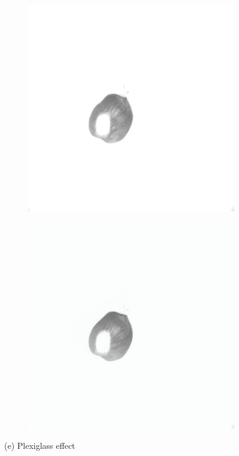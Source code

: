 \documentclass[12pt,DIV14,BCOR12mm,a4paper,footinclude=false,headinclude,parskip=half-,twoside,openright,cleardoublepage=empty,toc=index,bibliography=totoc,listof=totoc]{scrreprt}
\numberwithin{equation}{chapter}
\begin{document}
\begin{figure}
    \vspace{0.3cm} %

    \begin{subfigure}[t]{0.45\textwidth}
        \centering
        \includegraphics[width=\textwidth]{../media/diff_nuts_plexi_real.png}
    \end{subfigure}%
    \hspace{0.02\textwidth}%
    \begin{subfigure}[t]{0.45\textwidth}
        \centering
        \includegraphics[width=\textwidth]{../media/diff_nuts_plexi_fake.png}
    \end{subfigure}
    \caption*{(e) Plexiglass effect}


\end{figure}
\end{document}
